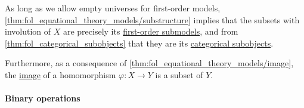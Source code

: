 \begin{definition}
\begin{thmenum}
    As long as we allow empty universes for first-order models, \cref{thm:fol_equational_theory_models/substructure} implies that the subsets with involution of \( X \) are precisely its \hyperref[def:fol_substructure/submodel]{first-order submodels}, and from \cref{thm:fol_categorical_subobjects} that they are its \hyperref[def:categorical_subobject]{categorical subobjects}.

    Furthermore, as a consequence of \cref{thm:fol_equational_theory_models/image}, the \hyperref[def:set_valued_function/image]{image} of a homomorphism \( \varphi: X \to Y \) is a subset of \( Y \).
  \end{thmenum}
\end{definition}

\paragraph{Binary operations}

